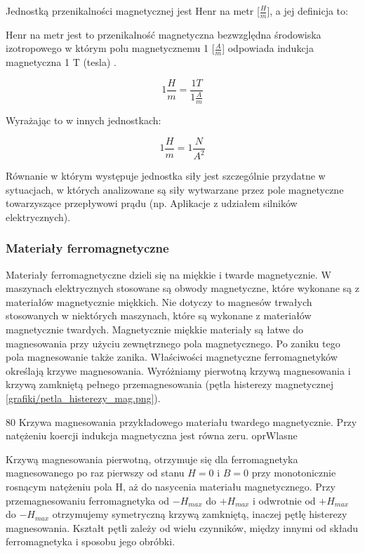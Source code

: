 Jednostką przenikalności magnetycznej jest Henr na metr [$ \frac{H}{m} $], a jej definicja to:

\begin{defn}
	Henr na metr jest to przenikalność magnetyczna bezwzględna środowiska izotropowego w którym polu magnetycznemu 1 [$ \frac{A}{m} $] odpowiada indukcja magnetyczna 1 T (tesla) \cite{kaluszko}.
	
	\begin{equation} \label{eq:indmag4}
		1 \frac{H}{m} = \frac{1 T}{1 \frac{A}{m}}
	\end{equation}
\end{defn}

Wyrażając to w innych jednostkach:

\begin{equation} \label{eq:indmag5}
	1 \frac{H}{m} = 1 \frac{N}{A^2}
\end{equation}

Równanie w którym występuje jednostka siły jest szczególnie przydatne w sytuacjach, w których analizowane są siły wytwarzane przez pole magnetyczne towarzyszące przepływowi prądu (np. Aplikacje z udziałem silników elektrycznych).

\subsubsection{Materiały ferromagnetyczne} 
\label{subsec:materialy_fer}

Materiały ferromagnetyczne dzieli się na miękkie i twarde magnetycznie. W maszynach elektrycznych stosowane są obwody magnetyczne, które wykonane są z materiałów magnetycznie miękkich. Nie dotyczy to magnesów trwałych stosowanych w niektórych maszynach, które są wykonane z materiałów magnetycznie twardych. Magnetycznie miękkie materiały są łatwe do magnesowania przy użyciu zewnętrznego pola magnetycznego. Po zaniku tego pola magnesowanie także zanika. Właściwości magnetyczne ferromagnetyków określają krzywe magnesowania. Wyróżniamy pierwotną krzywą magnesowania i krzywą zamkniętą pełnego przemagnesowania (pętla histerezy magnetycznej \ref{grafiki/petla_histerezy_mag.png}).

		{80}   
	   	{Krzywa magnesowania przykładowego materiału twardego magnetycznie. Przy natężeniu koercji indukcja magnetyczna jest równa zeru.}
	   	{oprWlasne}
	   
Krzywą magnesowania pierwotną, otrzymuje się dla ferromagnetyka magnesowanego po raz pierwszy od stanu $ H = 0 $ i $ B = 0 $ przy monotonicznie rosnącym natężeniu pola H, aż do nasycenia materiału magnetycznego. Przy przemagnesowaniu ferromagnetyka od $ -H_{max} $ do $ +H_{max} $ i odwrotnie od $ +H_{max} $ do $ -H_{max} $ otrzymujemy symetryczną krzywą zamkniętą, inaczej pętlę histerezy magnesowania. Kształt pętli zależy od wielu czynników, między innymi od składu ferromagnetyka i sposobu jego obróbki. \\

